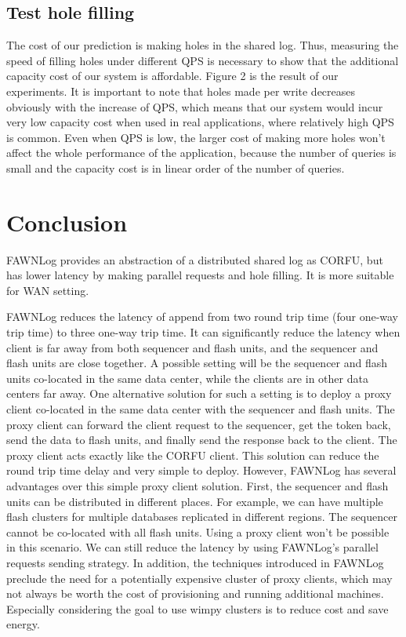 \documentclass[letterpaper,twocolumn,10pt]{article}
\begin{document}
\subsection{Test hole filling}
The cost of our prediction is making holes in the shared log. Thus, measuring the speed of filling holes under different QPS is necessary to show that the additional capacity cost of our system is affordable. Figure 2 is the result of our experiments. It is important to note that holes made per write decreases obviously with the increase of QPS, which means that our system would incur very low capacity cost when used in real applications, where relatively high QPS is common. Even when QPS is low, the larger cost of making more holes won’t affect the whole performance of the application, because the number of queries is small and the capacity cost is in linear order of the number of queries.


\section{Conclusion}
FAWNLog provides an abstraction of a distributed shared log as CORFU\cite{corfu}, but has lower latency by making parallel requests and hole filling. It is more suitable for WAN setting.

FAWNLog reduces the latency of append from two round trip time (four one-way trip time) to three one-way trip time. It can significantly reduce the latency when client is far away from both sequencer and flash units, and the sequencer and flash units are close together. A possible setting will be the sequencer and flash units co-located in the same data center, while the clients are in other data centers far away. One alternative solution for such a setting is to deploy a proxy client co-located in the same data center with the sequencer and flash units. The proxy client can forward the client request to the sequencer, get the token back, send the data to flash units, and finally send the response back to the client. The proxy client acts exactly like the CORFU client. This solution can reduce the round trip time delay and very simple to deploy. However, FAWNLog has several advantages over this simple proxy client solution. First, the sequencer and flash units can be distributed in different places. For example, we can have multiple flash clusters for multiple databases replicated in different regions. The sequencer cannot be co-located with all flash units. Using a proxy client won’t be possible in this scenario. We can still reduce the latency by using FAWNLog’s parallel requests sending strategy. In addition, the techniques introduced in FAWNLog preclude the need for a potentially expensive cluster of proxy clients, which may not always be worth the cost of provisioning and running additional machines. Especially considering the goal to use wimpy clusters is to reduce cost and save energy.
\end{document}
